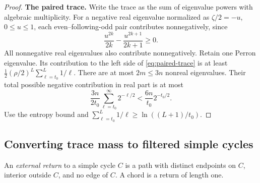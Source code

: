 \documentclass[11pt,a4paper]{article}
\numberwithin{equation}{section}
\theoremstyle{definition}
\theoremstyle{remark}
\newcommand{\proofstep}[1]{\par\addvspace{\medskipamount}\noindent\textbf{#1}\enspace\ignorespaces}
\begin{document}
\begin{proof}
\proofstep{The paired trace.}
Write the trace as the sum of eigenvalue powers with algebraic multiplicity. For a negative real eigenvalue normalized as $\zeta/2=-u$, $0\le u\le1$, each even--following-odd pair contributes nonnegatively, since
\[
 \frac{u^{2k}}{2k}-\frac{u^{2k+1}}{2k+1}\ge0.
\]
All nonnegative real eigenvalues also contribute nonnegatively. Retain one Perron eigenvalue. Its contribution to the left side of \eqref{eq:paired-trace} is at least
$\frac12(\rho/2)^L\sum_{\ell=t_0}^{L}1/\ell$.
There are at most $2m\le3n$ nonreal eigenvalues. Their total possible negative contribution in real part is at most
\[
 \frac{3n}{2t_0}\sum_{\ell=t_0}^{\infty}2^{-\ell/2}
 <\frac{6n}{t_0}2^{-t_0/2}.
\]
Use the entropy bound and $\sum_{\ell=t_0}^L1/\ell\ge\ln((L+1)/t_0)$.
\end{proof}

\subsection{Converting trace mass to filtered simple cycles}
An \emph{external return} to a simple cycle $C$ is a path with distinct endpoints on $C$, interior outside $C$, and no edge of $C$. A chord is a return of length one.
\end{document}
